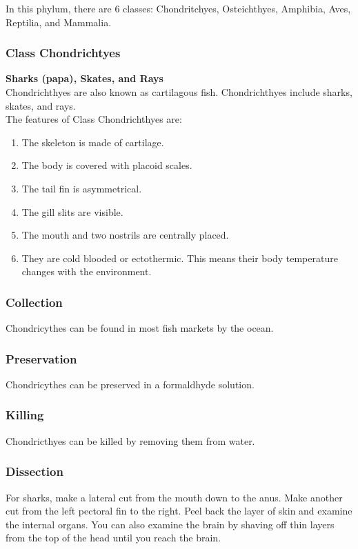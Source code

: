 In this phylum, there are 6 classes: Chondritchyes, Osteichthyes, Amphibia, Aves, Reptilia, and Mammalia.

\subsubsection{Class Chondrichtyes}
\textbf{Sharks (papa), Skates, and Rays}\\
Chondrichthyes are also known as cartilagous fish. Chondrichthyes include sharks, skates, and rays.\\
The features of Class Chondrichthyes are:
\begin{enumerate}
\item{The skeleton is made of cartilage.}
\item{The body is covered with placoid scales.}
\item{The tail fin is asymmetrical.}
\item{The gill slits are visible.}
\item{The mouth and two nostrils are centrally placed.}
\item{They are cold blooded or ectothermic. This means their body temperature changes with the environment.}
\end{enumerate}

\subsubsection{Collection}
Chondricythes can be found in most fish markets by the ocean. 

\subsubsection{Preservation} 
Chondricythes can be preserved in a formaldhyde solution.

\subsubsection{Killing}
Chondricthyes can be killed by removing them from water. 

\subsubsection{Dissection}
For sharks, make a lateral cut from the mouth down to the anus. Make another cut from the left pectoral fin to the right. Peel back the layer of skin and examine the internal organs. You can also examine the brain by shaving off thin layers from the top of the head until you reach the brain.

